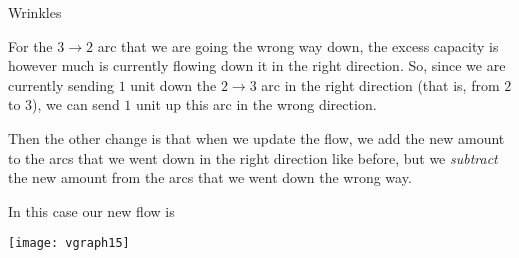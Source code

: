 \begin{frame}[fragile]{Wrinkles}

For the $3\rightarrow 2$ arc that we are going the wrong way down, the excess capacity is however much is currently flowing down it in the right direction.  So, since we are currently sending $1$ unit down the $2\rightarrow 3$ arc in the right direction (that is, from $2$ to $3$), we can send $1$ unit up this arc in the wrong direction.

Then the other change is that when we update the flow, we add the new amount to the arcs that we went down in the right direction like before, but we {\it subtract\/} the new amount from the arcs that we went down the wrong way.

In this case our new flow is

\begin{center}
\texttt{[image: vgraph15]}
\end{center}


%
%
%
%

\end{frame}
